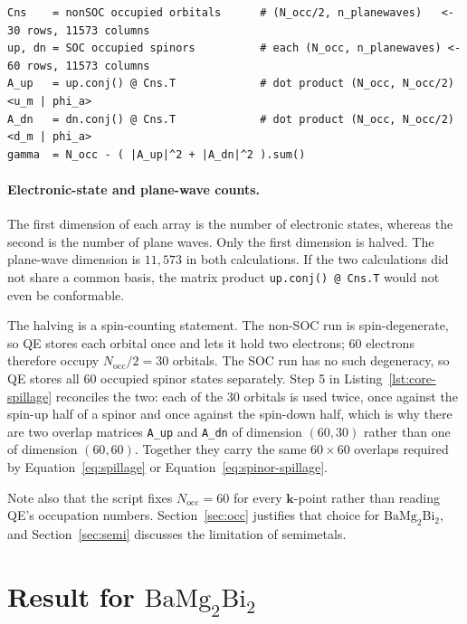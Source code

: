 \documentclass[11pt]{article}
\newcommand{\Nocc}{N_{\mathrm{occ}}}
\newcommand{\kk}{\mathbf{k}}
\newcommand{\bmb}{\mathrm{BaMg_2Bi_2}}
\begin{document}
\begin{lstlisting}[caption={Calculation at each $\kk$-point (from
\texttt{compute\_spillage.py}). Every array is (rows = electronic states) $\times$ (columns = plane
waves). For $\bmb$ at $\Gamma$: N\_occ = 60, so the array dimensions are (30, 11573) and
(60, 11573).},label={lst:core-spillage}]
Cns    = nonSOC occupied orbitals      # (N_occ/2, n_planewaves)   <- 30 rows, 11573 columns
up, dn = SOC occupied spinors          # each (N_occ, n_planewaves) <- 60 rows, 11573 columns
A_up   = up.conj() @ Cns.T             # dot product (N_occ, N_occ/2) <u_m | phi_a>
A_dn   = dn.conj() @ Cns.T             # dot product (N_occ, N_occ/2) <d_m | phi_a>
gamma  = N_occ - ( |A_up|^2 + |A_dn|^2 ).sum()
\end{lstlisting}

\paragraph{Electronic-state and plane-wave counts.} The first dimension of each array is the number
of electronic states, whereas the second is the number of plane waves. Only the first dimension is halved. The
plane-wave dimension is $11{,}573$ in both calculations. If the two calculations did not share a
common basis, the matrix product
\texttt{up.conj() @ Cns.T} would not even be conformable.

The halving is a spin-counting statement. The non-SOC run is spin-degenerate, so QE stores each
orbital once and lets it hold two electrons; $60$ electrons therefore occupy $\Nocc/2=30$ orbitals.
The SOC run has no such degeneracy, so QE stores all $60$ occupied spinor states separately. Step 5
in Listing~\ref{lst:core-spillage} reconciles the two: each of the $30$ orbitals is used twice, once
against the spin-up half of a spinor and once against the spin-down half, which is why there are two
overlap matrices \texttt{A\_up} and \texttt{A\_dn} of dimension $(60,30)$ rather than one of
dimension $(60,60)$. Together they carry the same $60\times60$ overlaps required by
Equation~\eqref{eq:spillage} or Equation~\eqref{eq:spinor-spillage}.

\medskip
\noindent Note also that the script fixes $\Nocc=60$ for every $\kk$-point rather than reading QE's
occupation numbers. Section~\ref{sec:occ} justifies that choice for $\bmb$, and
Section~\ref{sec:semi} discusses the limitation of semimetals.

\section{Result for $\bmb$}\label{sec:result}
\end{document}
